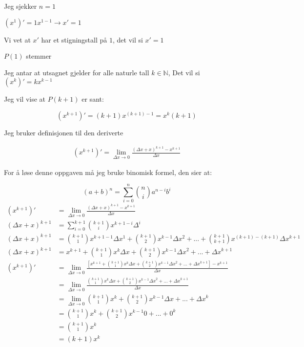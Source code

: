 \documentclass{article}
\begin{document}
Jeg sjekker $n=1$

$(x^1)'= 1x^{1-1} \rightarrow x'=1$

Vi vet at $x'$ har et stigningstall på $1$, det vil si $x'= 1$

$P(1)$ stemmer

Jeg antar at utsagnet gjelder for alle naturle tall $k \in \mathbb{N}$, Det vil si $(x^k)' = kx^{k-1}$

Jeg vil vise at $P(k+1)$ er sant:

$$(x^{k+1})' = (k+1)x^{(k+1)-1} = x^k(k+1)$$

Jeg bruker definisjonen til den deriverte

\begin{align*}
    (x^{k+1})'=\lim_{\Delta x \rightarrow 0}\frac{(\Delta x + x)^{k+1}-x^{k+1}}{\Delta x}
\end{align*}

For å løse denne oppgaven må jeg bruke binomisk formel, den sier at:

$$(a+b)^n=\sum_{i=0}^{n}\binom{n}{i}a^{n-i}b^i$$
\begin{align*}
    (x^{k+1})' &= \lim_{\Delta x \rightarrow 0} \frac{(\Delta x + x)^{k+1} - x^{k+1}}{\Delta x} \\
    (\Delta x + x)^{k+1} &= \sum_{i=0}^{k+1}\binom{k+1}{i}x^{k+1-i}\Delta^i \\
    (\Delta x + x)^{k+1} &= \binom{k+1}{1}x^{k+1-1}\Delta x^1+\binom{k+1}{2}x^{k-1}\Delta x^2+...+\binom{k+1}{k+1}x^{(k+1)-(k+1)} \Delta x ^{k+1} \\
    (\Delta x + x)^{k+1} &= x^{k+1}+\binom{k+1}{1}x^k\Delta x + \binom{k+1}{2}x^{k-1}{\Delta x} ^2+...+{\Delta x}^{k+1} \\
    (x^{k+1})' &= \lim_{\Delta x \rightarrow 0} \frac{[x^{k+1}+\binom{k+1}{1}x^k\Delta x + \binom{k+1}{2}x^{k-1}{\Delta x} ^2+...+{\Delta x}^{k+1}] - x^{k+1}}{\Delta x} \\
    &= \lim_{\Delta x \rightarrow 0} \frac{\binom{k+1}{1}x^k\Delta x + \binom{k+1}{2}x^{k-1}{\Delta x} ^2+...+{\Delta x}^{k+1}}{\Delta x} \\
    &= \lim_{\Delta x \rightarrow 0} \binom{k+1}{1}x^k + \binom{k+1}{2} x^{k-1} \Delta x + ... + {\Delta x}^k \\
    &= \binom{k+1}{1}x^k+\binom{k+1}{2}x^{k-1}0+...+0^k \\
    &= \binom{k+1}{1}x^k \\
    &= (k+1)x^k \\
\end{align*}
\end{document}

